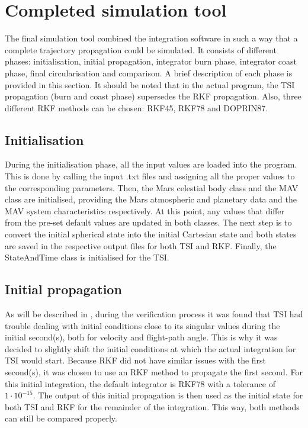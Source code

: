 \section{Completed simulation tool}
\label{sec:completedSimulationTool}
The final simulation tool combined the integration software in such a way that a complete trajectory propagation could be simulated. It consists of different phases: initialisation, initial propagation, integrator burn phase, integrator coast phase, final circularisation and comparison. A brief description of each phase is provided in this section. It should be noted that in the actual program, the \ac{TSI} propagation (burn and coast phase) supersedes the \ac{RKF} propagation. Also, three different \ac{RKF} methods can be chosen: \acf{RKF45}, \ac{RKF78} and  \ac{DOPRIN87}.

\subsection{Initialisation}
\label{subsec:initialisation}
During the initialisation phase, all the input values are loaded into the program. This is done by calling the input .txt files and assigning all the proper values to the corresponding parameters. Then, the Mars celestial body class and the \ac{MAV} class are initialised, providing the Mars atmospheric and planetary data and the \ac{MAV} system characteristics respectively. At this point, any values that differ from the pre-set default values are updated in both classes. The next step is to convert the initial spherical state into the initial Cartesian state and both states are saved in the respective output files for both \ac{TSI} and \ac{RKF}. Finally, the StateAndTime class is initialised for the \ac{TSI}.

\subsection{Initial propagation}
\label{subsec:initialPropagation}
As will be described in , during the verification process it was found that \ac{TSI} had trouble dealing with initial conditions close to its singular values during the initial second(s), both for velocity and flight-path angle. This is why it was decided to slightly shift the initial conditions at which the actual integration for \ac{TSI} would start. Because \ac{RKF} did not have similar issues with the first second(s), it was chosen to use an \ac{RKF} method to propagate the first second. For this initial integration, the default integrator is \ac{RKF78} with a tolerance of $1\cdot 10^{-15}$. The output of this initial propagation is then used as the initial state for both \ac{TSI} and \ac{RKF} for the remainder of the integration. This way, both methods can still be compared properly. 


